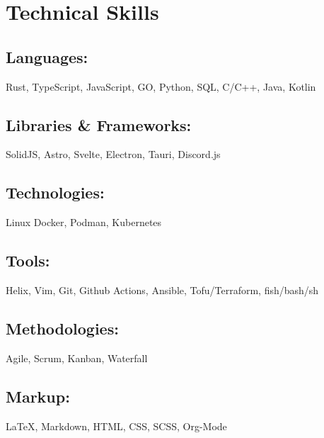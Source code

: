 \section{Technical Skills}

\subsection{Languages:} Rust, TypeScript, JavaScript, GO, Python, SQL, C/C++, Java, Kotlin
\subsection{Libraries \& Frameworks:} SolidJS, Astro, Svelte, Electron, Tauri, Discord.js
\subsection{Technologies:} Linux Docker, Podman, Kubernetes
\subsection{Tools:} Helix, Vim, Git, Github Actions, Ansible, Tofu/Terraform, fish/bash/sh
\subsection{Methodologies:} Agile, Scrum, Kanban, Waterfall
\subsection{Markup:} {\LaTeX}, Markdown, HTML, CSS, SCSS, Org-Mode
